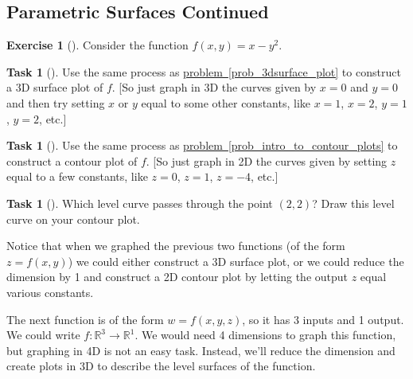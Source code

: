 \documentclass[10pt,]{book}
\theoremstyle{plain}
\theoremstyle{definition}
\theoremstyle{definition}
\theoremstyle{definition}
\theoremstyle{definition}
\newtheorem{exploration}[project]{Exercise}
\newtheorem{task}[project]{Task}
\theoremstyle{definition}
\numberwithin{equation}{section}
\begin{document}
\subsection[{Parametric Surfaces Continued}]{Parametric Surfaces Continued}\label{subsection-24}
\begin{exploration}[]\label{exploration-113}
Consider the function \(f(x,y)=x-y^2\).%
\begin{task}[]\label{task-219}
Use the same process as \hyperref[prob_3dsurface_plot]{problem~\ref{prob_3dsurface_plot}} to construct a 3D surface plot of \(f\). [So just graph in 3D the curves given by \(x=0\) and \(y=0\) and then try setting \(x\) or \(y\) equal to some other constants, like \(x=1\), \(x=2\), \(y=1\), \(y=2\), etc.]%
\end{task}
\begin{task}[]\label{task-220}
Use the same process as \hyperref[prob_intro_to_contour_plots]{problem~\ref{prob_intro_to_contour_plots}} to construct a contour plot of \(f\). [So just graph in 2D the curves given by setting \(z\) equal to a few constants, like \(z=0\), \(z=1\), \(z=-4\), etc.]%
\end{task}
\begin{task}[]\label{task-221}
Which level curve passes through the point \((2,2)\)?  Draw this level curve on your contour plot.%
\end{task}
\end{exploration}
Notice that when we graphed the previous two functions (of the form \(z=f(x,y)\)) we could either construct a 3D surface plot, or we could reduce the dimension by 1 and construct a 2D contour plot by letting the output \(z\) equal various constants.%
\par
The next function is of the form \(w=f(x,y,z)\), so it has 3 inputs and 1 output. We could write \(f\colon \mathbb{R}^3\to\mathbb{R}^1\). We would need 4 dimensions to graph this function, but graphing in 4D is not an easy task. Instead, we'll reduce the dimension and create plots in 3D to describe the level surfaces of the function.%
\end{document}
